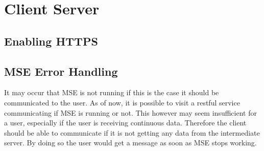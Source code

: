 \section{Client Server}

\subsection*{Enabling HTTPS}

\subsection*{MSE Error Handling}
It may occur that MSE is not running if this is the case it should be communicated to the user. As of now, it is possible to visit a restful service communicating if MSE is running or not. This however may seem insufficient for a user, especially if the user is receiving continuous data. Therefore the client should be able to communicate if it is not getting any data from the intermediate server. By doing so the user would get a message as soon as MSE stops working.